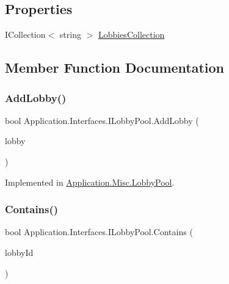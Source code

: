 \subsection*{Properties}
\begin{DoxyCompactItemize}
\item 
I\+Collection$<$ string $>$ \mbox{\hyperlink{interface_application_1_1_interfaces_1_1_i_lobby_pool_acbba38f6800479622a56b3347bbd1f63}{Lobbies\+Collection}}
\end{DoxyCompactItemize}


\subsection{Member Function Documentation}
\mbox{\label{interface_application_1_1_interfaces_1_1_i_lobby_pool_a2aa933d501630b665f67c68e39012a4c}} 
\subsubsection{\texorpdfstring{Add\+Lobby()}{AddLobby()}}
{\footnotesize\ttfamily bool Application.\+Interfaces.\+I\+Lobby\+Pool.\+Add\+Lobby (\begin{DoxyParamCaption}\item[{I\+Lobby}]{lobby }\end{DoxyParamCaption})}



Implemented in \mbox{\hyperlink{class_application_1_1_misc_1_1_lobby_pool_a442eb666b16bc75025732413f38b0846}{Application.\+Misc.\+Lobby\+Pool}}.

\mbox{\label{interface_application_1_1_interfaces_1_1_i_lobby_pool_a9a09df8415ae760c99d5a6bcd1ac91f9}} 
\subsubsection{\texorpdfstring{Contains()}{Contains()}}
{\footnotesize\ttfamily bool Application.\+Interfaces.\+I\+Lobby\+Pool.\+Contains (\begin{DoxyParamCaption}\item[{string}]{lobby\+Id }\end{DoxyParamCaption})}



